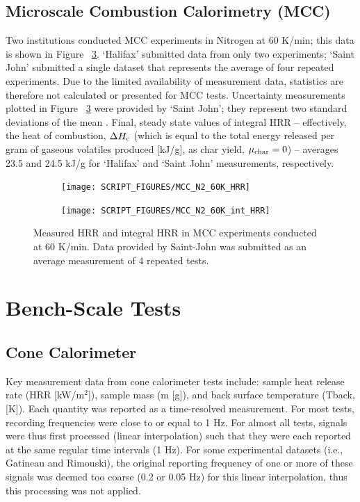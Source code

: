 \documentclass{book}
\begin{document}
\subsection{Microscale Combustion Calorimetry (MCC)}

Two institutions conducted MCC experiments in Nitrogen at 60 K/min; this data is shown in Figure ~\ref{Fig:MCC_N2_60K}. ‘Halifax’ submitted data from only two experiments; ‘Saint John’ submitted a single dataset that represents the average of four repeated experiments.  Due to the limited availability of measurement data, statistics are therefore not calculated or presented for MCC tests. Uncertainty measurements plotted in Figure ~\ref{Fig:MCC_N2_60K} were provided by ‘Saint John’; they represent two standard deviations of the mean \cite{fiola2020comparison}. Final, steady state values of integral HRR – effectively, the heat of combustion, $\Delta H_{\rm c}$ (which is equal to the total energy released per gram of gaseous volatiles produced [kJ/g], as char yield, $\mu_{\rm char}=0$) – averages 23.5 and 24.5 kJ/g for ‘Halifax’ and ‘Saint John’ measurements, respectively.

\begin{figure}
\centering
\begin{subfigure}[b]{0.85\textwidth}
   \texttt{[image: SCRIPT\_FIGURES/MCC\_N2\_60K\_HRR]}
   \caption{}
   \label{Fig:MCC_N2_60K_HRR} 
\end{subfigure}

\begin{subfigure}[b]{0.85\textwidth}
   \texttt{[image: SCRIPT\_FIGURES/MCC\_N2\_60K\_int\_HRR]}
   \caption{}
   \label{Fig:MCC_N2_60K_int_HRR} 
\end{subfigure}
  
  \caption{Measured HRR and integral HRR in MCC experiments conducted at 60 K/min. Data provided by Saint-John was submitted as an average measurement of 4 repeated tests.}
  \label{Fig:MCC_N2_60K}
\end{figure}


\section{Bench-Scale Tests}

\subsection{Cone Calorimeter}

Key measurement data from cone calorimeter tests include: sample heat release rate (HRR [kW/m$^2$]), sample mass (m [g]), and back surface temperature (Tback, [K]). Each quantity was reported as a time-resolved measurement. For most tests, recording frequencies were close to or equal to 1 Hz. For almost all tests, signals were thus first processed (linear interpolation) such that they were each reported at the same regular time intervals (1 Hz). For some experimental datasets (i.e., Gatineau and Rimouski), the original reporting frequency of one or more of these signals was deemed too coarse (0.2 or 0.05 Hz) for this linear interpolation, thus this processing was not applied.
\end{document}
